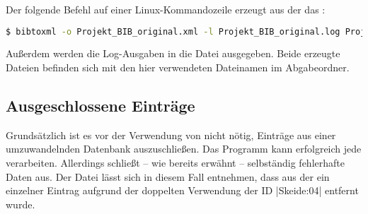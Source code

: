 \begin{flushleft}
Der folgende Befehl auf einer Linux-Kommandozeile erzeugt aus der  \BibTeXdatabase{} das \BibTeXXMLdoc{} :
\end{flushleft}
\begin{lstlisting}[language=bash]
$ bibtoxml -o Projekt_BIB_original.xml -l Projekt_BIB_original.log Projekt_BIB_original.txt
\end{lstlisting}
Außerdem werden die Log-Ausgaben in die Datei 
ausgegeben. Beide erzeugte Dateien befinden sich mit den hier verwendeten
Dateinamen im Abgabeordner.

\subsection{Ausgeschlossene Einträge}

Grundsätzlich ist es vor der Verwendung von  nicht nötig,
Einträge aus einer umzuwandelnden Datenbank auszuschließen. Das Programm kann
erfolgreich jede \BibTeXdatabase{} verarbeiten. Allerdings schließt
 -- wie bereits erwähnt -- selbständig fehlerhafte Daten aus. Der
Datei  lässt sich in diesem Fall entnehmen,
dass aus der \BibTeXdatabase{} ein einzelner Eintrag aufgrund der doppelten
Verwendung der ID \lstinlineplain|Skeide:04| entfernt wurde.